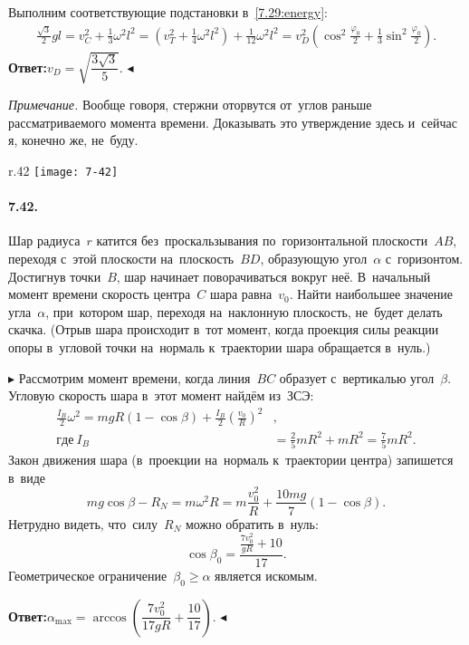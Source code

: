 \documentclass{weekly}
\begin{document}
Выполним соответствующие подстановки в~\eqref{7.29:energy}:
\begin{gather}
    \frac{\sqrt{3}}{2} gl = v_C^2 + \frac{1}{3} \omega^2 l^2
        = \left(v_T^2 + \frac{1}{4} \omega^2 l^2\right)
            + \frac{1}{12} \omega^2 l^2
        = v_D^2 \left(\cos^2\frac{\varphi_0}{2}
            + \frac{1}{3} \sin^2\frac{\varphi_0}{2}\right).
\end{gather}
\textbf{Ответ:}\qquad $v_D = \sqrt{\dfrac{3\sqrt{3}}{5}}$.
\hfill $\blacktriangleleft$

\bigskip
\begin{small}
\textsl{Примечание.} Вообще говоря, стержни оторвутся от~углов
раньше рассматриваемого момента времени.
Доказывать это утверждение здесь и~сейчас я, конечно же, не~буду.
\end{small}


\begin{wrapfigure}[6]{r}{.42\textwidth}
\texttt{[image: 7-42]}
\end{wrapfigure}
\paragraph{7.42.} Шар радиуса~$r$ катится без~проскальзывания
по~горизонтальной плоскости~$AB$, переходя с~этой плоскости
на~плоскость~$BD$, образующую угол~$\alpha$ с~горизонтом.
Достигнув точки~$B$, шар начинает поворачиваться вокруг неё.
В~начальный момент времени скорость центра~$C$ шара равна~$v_0$.
Найти наибольшее значение угла~$\alpha$, при~котором шар,
переходя на~наклонную плоскость, не~будет делать скачка.
(Отрыв шара происходит в~тот момент, когда проекция силы реакции
опоры в~угловой точки на~нормаль к~траектории шара обращается в~нуль.)

$\blacktriangleright$ Рассмотрим момент времени, когда
линия~$BC$ образует с~вертикалью угол~$\beta$.
Угловую скорость шара в~этот момент найдём из~ЗСЭ:
\begin{align}
    \frac{I_B}{2} \omega^2 = mgR(1-\cos\beta) +
            \frac{I_B}{2} \left(\frac{v_0}{R}\right)^2&, \\
    где~I_B &= \frac{2}{5}mR^2 + mR^2 = \frac{7}{5}mR^2.
\end{align}
Закон движения шара (в~проекции на~нормаль к~траектории центра)
запишется в~виде
\begin{equation}
    mg\cos\beta - R_N = m\omega^2 R
        = m\frac{v_0^2}{R} + \frac{10mg}{7} (1-\cos\beta).
\end{equation}
Нетрудно видеть, что~силу~$R_N$ можно обратить в~нуль:
\begin{equation}
    \cos\beta_0 = \frac{\frac{7v_0^2}{gR} + 10}{17}.
\end{equation}
Геометрическое ограничение~$\beta_0 \geqslant \alpha$
является искомым.

\medskip
\textbf{Ответ:}\qquad $\alpha_{\max} =
\arccos \left( \dfrac{7v_0^2}{17gR} + \dfrac{10}{17} \right)$.
\hfill $\blacktriangleleft$
\end{document}
